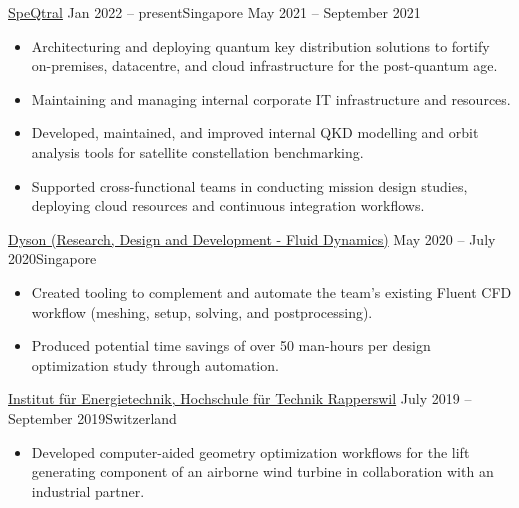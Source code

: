 \documentclass[10.5pt,a4paper,ragged2e,withhyper]{altacv}
\begin{document}
\begin{paracol}{2}


  {\href{https://speqtralquantum.com}{SpeQtral}}
  {Jan 2022 -- present}{Singapore}
  {}{May 2021 -- September 2021}{}
\begin{itemize}
\item Architecturing and deploying quantum key distribution solutions to fortify on-premises, datacentre, and cloud infrastructure for the post-quantum age.
\item Maintaining and managing internal corporate IT infrastructure and resources.
\item Developed, maintained, and improved internal QKD modelling and orbit analysis tools for satellite constellation benchmarking.
\item Supported cross-functional teams in conducting mission design studies, deploying cloud resources and continuous integration workflows.
\end{itemize}

\divider

  {\href{https://careers.dyson.com/en-gb/what-you-can-do/engineer/research/}{Dyson (Research, Design and Development - Fluid Dynamics)}}
  {May 2020 -- July 2020}{Singapore}
\begin{itemize}
\item Created tooling to complement and automate the team's existing Fluent CFD workflow (meshing, setup, solving, and postprocessing).
\item Produced potential time savings of over 50 man-hours per design optimization study through automation.
\end{itemize}

\divider

  {\href{https://www.ost.ch/de/forschung-und-dienstleistungen/technik/erneuerbare-energien-und-umwelttechnik/iet-institut-fuer-energietechnik}{Institut für Energietechnik, Hochschule für Technik Rapperswil}}
  {July 2019 -- September 2019}{Switzerland}
\begin{itemize}
\item Developed computer-aided geometry optimization workflows for the lift generating component of an airborne wind turbine in collaboration with an industrial partner.
\end{itemize}


\end{paracol}
\end{document}
